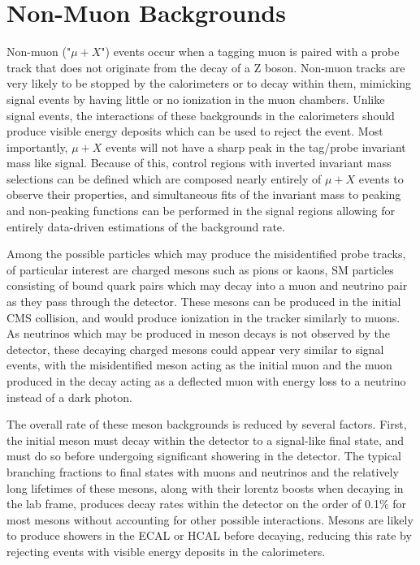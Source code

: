 \section{Non-Muon Backgrounds}
Non-muon ("$\mu+X$") events occur when a tagging muon is paired with a probe track that does not originate from the decay of a Z boson. 
Non-muon tracks are very likely to be stopped by the calorimeters or to decay within them, mimicking signal events by having little or no ionization in the muon chambers. 
Unlike signal events, the interactions of these backgrounds in the calorimeters should produce visible energy deposits which can be used to reject the event.
Most importantly, $\mu+X$ events will not have a sharp peak in the tag/probe invariant mass like signal.
Because of this, control regions with inverted invariant mass selections can be defined which are composed nearly entirely of $\mu+X$ events to observe their properties, and simultaneous fits of the invariant mass to peaking and non-peaking functions can be performed in the signal regions allowing for entirely data-driven estimations of the background rate.

Among the possible particles which may produce the misidentified probe tracks, of particular interest are charged mesons such as pions or kaons, SM particles consisting of bound quark pairs which may decay into a muon and neutrino pair as they pass through the detector.
These mesons can be produced in the initial CMS collision, and would produce ionization in the tracker similarly to muons.
As neutrinos which may be produced in meson decays is not observed by the detector, these decaying charged mesons could appear very similar to signal events, with the misidentified meson acting as the initial muon and the muon produced in the decay acting as a deflected muon with energy loss to a neutrino instead of a dark photon.

The overall rate of these meson backgrounds is reduced by several factors.
First, the initial meson must decay within the detector to a signal-like final state, and must do so before undergoing significant showering in the detector.
The typical branching fractions to final states with muons and neutrinos and the relatively long lifetimes of these mesons, along with their lorentz boosts when decaying in the lab frame, produces decay rates within the detector on the order of 0.1$\%$ for most mesons without accounting for other possible interactions.
Mesons are likely to produce showers in the ECAL or HCAL before decaying, reducing this rate by rejecting events with visible energy deposits in the calorimeters.

